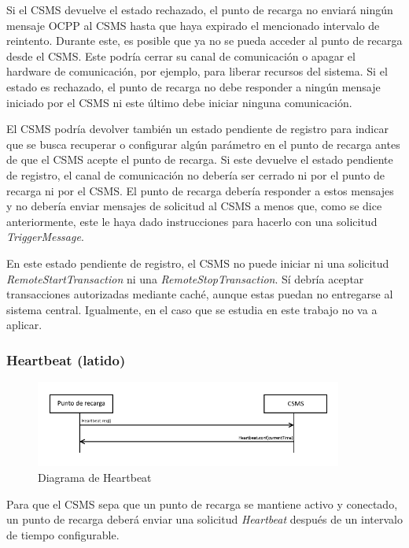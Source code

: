 \documentclass[12pt,a4paper,onecolumn,oneside]{report}
\begin{document}
Si el CSMS devuelve el estado rechazado, el punto de recarga no enviará ningún mensaje OCPP al CSMS hasta que haya expirado el mencionado intervalo de reintento. Durante este, es posible que ya no se pueda acceder al punto de recarga desde el CSMS. Este podría cerrar su canal de comunicación o apagar el hardware de comunicación, por ejemplo, para liberar recursos del sistema. Si el estado es rechazado, el punto de recarga no debe responder a ningún mensaje iniciado por el CSMS ni este último debe iniciar ninguna comunicación.

El CSMS podría devolver también un estado pendiente de registro para indicar que se busca recuperar o configurar algún parámetro en el punto de recarga antes de que el CSMS acepte el punto de recarga. Si este devuelve el estado pendiente de registro, el canal de comunicación no debería ser cerrado ni por el punto de recarga ni por el CSMS. El punto de recarga debería responder a estos mensajes y no debería enviar mensajes de solicitud al CSMS a menos que, como se dice anteriormente, este le haya dado instrucciones para hacerlo con una solicitud \textit{TriggerMessage}.

En este estado pendiente de registro, el CSMS no puede iniciar ni una solicitud \textit{RemoteStartTransaction} ni una \textit{RemoteStopTransaction}. Sí debría aceptar transacciones autorizadas mediante caché, aunque estas puedan no entregarse al sistema central. Igualmente, en el caso que se estudia en este trabajo no va a aplicar.

\subsubsection{Heartbeat (latido)}
\label{Heartbeat (latido)}


\begin{figure}[H] 
\centering
  \includegraphics[width=0.9\textwidth]{figuras/diagramaheartbeat.png}
  \caption[Diagrama de \textit{Heartbeat}]{Diagrama de Heartbeat\\
  }
  \label{fig:diagramaheartbeat}
\end{figure}


Para que el CSMS sepa que un punto de recarga se mantiene activo y conectado, un punto de recarga deberá enviar una solicitud \textit{Heartbeat} después de un intervalo de tiempo configurable.
\end{document}
